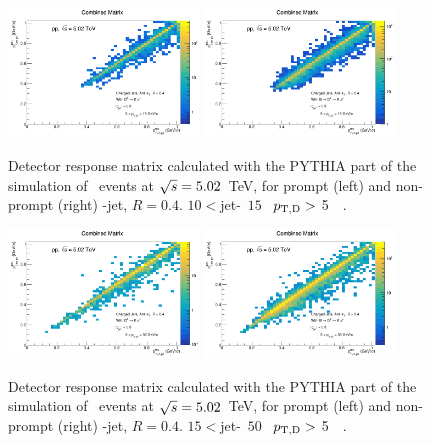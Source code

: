 \begin{figure}[bth]
\centering
\includegraphics[width=0.45\textwidth]{pp_2sig/response/R04/ProdMatrix_Jet10_15_Dpt5_15}
\includegraphics[width=0.45\textwidth]{pp_2sig/response/R04/ProdMatrixFD_Jet10_15_Dpt5_15}
\caption{Detector response matrix calculated with the PYTHIA part of the simulation of \pp\ events at $\sqrt{s}=5.02$~TeV, for prompt (left) and non-prompt (right) \Dzero-jet, $R=0.4$. $10<$jet-\pt\, $15$ \GeVc\, $p_{\mathrm{T,D}} > $ 5~\GeVc\ .}
\label{fig:fRMdet_pp_Dzero_10_15_R4}
\end{figure}

\begin{figure}[bth]
\centering
\includegraphics[width=0.45\textwidth]{pp_2sig/response/R04/ProdMatrix_Jet15_50_Dpt5_36}
\includegraphics[width=0.45\textwidth]{pp_2sig/response/R04/ProdMatrixFD_Jet15_50_Dpt5_36}
\caption{Detector response matrix calculated with the PYTHIA part of the simulation of \pp\ events at $\sqrt{s}=5.02$~TeV, for prompt (left) and non-prompt (right) \Dzero-jet, $R=0.4$. $15<$jet-\pt\, $50$ \GeVc\, $p_{\mathrm{T,D}} > $ 5~\GeVc\ .}
\label{fig:fRMdet_pp_Dzero_15_50_R4}
\end{figure}

